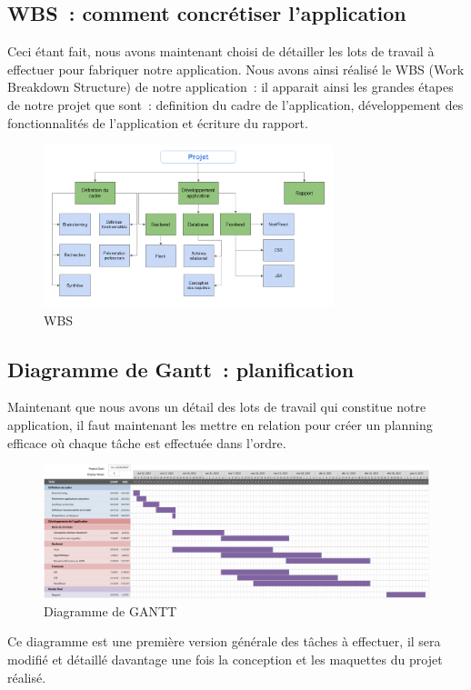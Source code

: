 \documentclass[french,a4paper]{article}
\begin{document}
\subsection{WBS~: comment concrétiser l’application}
Ceci étant fait, nous avons maintenant choisi de détailler les lots de travail à effectuer pour fabriquer notre application. Nous avons ainsi réalisé le WBS (Work Breakdown Structure) de notre application~: il apparait ainsi les grandes étapes de notre projet que sont~: definition du cadre de l’application, développement des fonctionnalités de l’application et écriture du rapport.
\begin{figure}[H]
    \centering
    \includegraphics[width=0.75\textwidth]{img/WBS.png}
    \caption{WBS}
\end{figure} 

\subsection{Diagramme de Gantt~: planification}
Maintenant que nous avons un détail des lots de travail qui constitue notre application, il faut maintenant les mettre en relation pour créer un planning efficace où chaque tâche est effectuée dans l’ordre.
\begin{figure}[H]
    \centering
    \includegraphics[width=1\textwidth]{img/gantt.png}
    \caption{Diagramme de GANTT}
\end{figure} 
Ce diagramme est une première version générale des tâches à effectuer, il sera modifié et détaillé davantage une fois la conception et les maquettes du projet réalisé.
\end{document}
